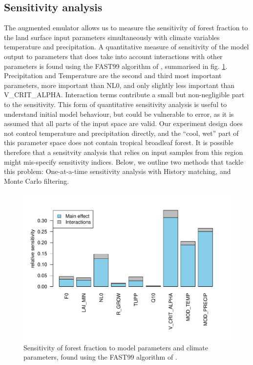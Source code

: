\documentclass[gmd, manuscript]{copernicus}
\begin{document}
\subsection{Sensitivity analysis}\label{ssec:sensitivity}
The augmented emulator allows us to measure the sensitivity of forest fraction to the land surface input parameters simultaneously with climate variables temperature and precipitation. A quantitative measure of sensitivity of the model output to parameters that does take into account interactions with other parameters is found using the FAST99 algorithm of \cite{saltelli1999sensitivity}, summarised in fig. \ref{fig:fast_barplot}. Precipitation and Temperature are the second and third most important parameters, more important than NL0, and only slightly less important than V\_CRIT\_ALPHA. Interaction terms contribute a small but non-negligible part to the sensitivity. This form of quantitative sensitivity analysis is useful to understand initial model behaviour, but could be vulnerable to error, as it is assumed that all parts of the input space are valid. Our experiment design does not control temperature and precipitation directly, and the ``cool, wet'' part of this parameter space does not contain tropical broadleaf forest. It is possible therefore that a sensitvity analysis that relies on input samples from this region might mis-specify sensitivity indices. Below, we outline two methods that tackle this problem: One-at-a-time sensitivity analysis with History matching, and Monte Carlo filtering.

\begin{figure}[t]
\includegraphics[width=12cm]{../graphics/fast_barplot.pdf}
\caption{Sensitivity of forest fraction to model parameters and climate parameters, found using the FAST99 algorithm of \cite{saltelli1999sensitivity}.
}
\label{fig:fast_barplot}
\end{figure}
\end{document}
